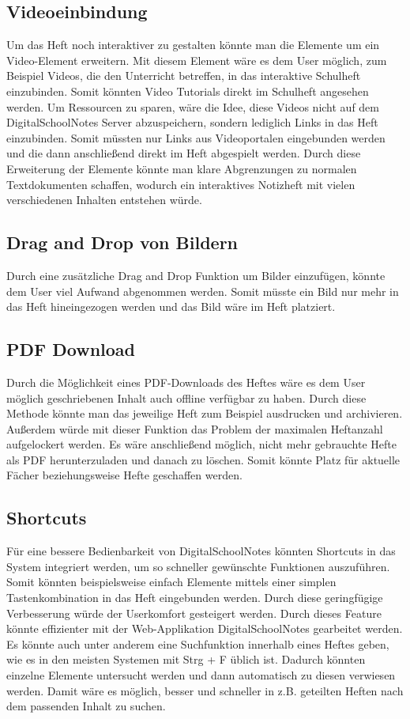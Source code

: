 \subsection{Videoeinbindung}
Um das Heft noch interaktiver zu gestalten könnte man die Elemente um ein Video-Element erweitern. Mit diesem Element wäre es dem User möglich, zum Beispiel Videos, die den Unterricht betreffen, in das interaktive Schulheft einzubinden. Somit könnten Video Tutorials direkt im Schulheft angesehen werden. Um Ressourcen zu sparen, wäre die Idee, diese Videos nicht auf dem DigitalSchoolNotes Server abzuspeichern, sondern lediglich Links in das Heft einzubinden. Somit müssten nur Links aus Videoportalen eingebunden werden und die dann anschließend direkt im Heft abgespielt werden. Durch diese Erweiterung der Elemente könnte man klare Abgrenzungen zu normalen Textdokumenten schaffen, wodurch ein interaktives Notizheft mit vielen verschiedenen Inhalten entstehen würde.
\subsection{Drag and Drop von Bildern}
Durch eine zusätzliche Drag and Drop Funktion um Bilder einzufügen, könnte dem User viel Aufwand abgenommen werden. Somit müsste ein Bild nur mehr in das Heft hineingezogen werden und das Bild wäre im Heft platziert. 
\subsection{PDF Download}
Durch die Möglichkeit eines PDF-Downloads des Heftes wäre es dem User möglich geschriebenen Inhalt auch offline verfügbar zu haben. Durch diese Methode könnte man das jeweilige Heft zum Beispiel ausdrucken und archivieren. Außerdem würde mit dieser Funktion das Problem der maximalen Heftanzahl aufgelockert werden. Es wäre anschließend möglich, nicht mehr gebrauchte Hefte als PDF herunterzuladen und danach zu löschen. Somit könnte Platz für aktuelle Fächer beziehungsweise Hefte geschaffen werden.
\subsection{Shortcuts}
Für eine bessere Bedienbarkeit von DigitalSchoolNotes könnten Shortcuts in das System integriert werden, um so schneller gewünschte Funktionen auszuführen. Somit könnten beispielsweise einfach Elemente mittels einer simplen Tastenkombination in das Heft eingebunden werden. Durch diese geringfügige Verbesserung würde der Userkomfort gesteigert werden. Durch dieses Feature könnte effizienter mit der Web-Applikation DigitalSchoolNotes gearbeitet werden.\\
Es könnte auch unter anderem eine Suchfunktion innerhalb eines Heftes geben, wie es in den meisten Systemen mit Strg + F üblich ist. Dadurch könnten einzelne Elemente untersucht werden und dann automatisch zu diesen verwiesen werden. Damit wäre es möglich, besser und schneller in z.B. geteilten Heften nach dem passenden Inhalt zu suchen. 
